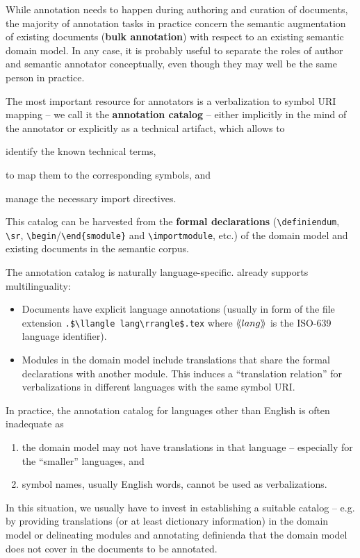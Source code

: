 \documentclass[runningheads]{llncs}
\def\llangle{\langle\kern-.2em\langle}
\def\rrangle{\rangle\kern-.2em\rangle}
\begin{document}
While annotation needs to happen during authoring and curation of documents, the majority
of annotation tasks in practice concern the semantic augmentation of existing documents
(\textbf{bulk annotation}) with respect to an existing semantic domain model. In any case,
it is probably useful to separate the roles of author and semantic annotator conceptually,
even though they may well be the same person in practice.

The most important resource for annotators is a verbalization to symbol URI mapping -- we
call it the \textbf{annotation catalog} -- either implicitly in the mind of the annotator
or explicitly as a technical artifact, which allows to
\begin{inparaenum}[\em i\rm)]
\item identify the known technical terms,
\item to map them to the corresponding symbols, and 
\item manage the necessary import directives.
\end{inparaenum}
This catalog can be harvested from the \textbf{formal declarations}
(\lstinline|\definiendum|, \lstinline|\sr|, \lstinline[language={}]|\begin|/\lstinline[language={}]|\end{smodule}| and
\lstinline|\importmodule|, etc.) of the domain model and existing documents in the
semantic corpus.

The annotation catalog is naturally language-specific.
\sTeX already supports multilinguality:
\begin{itemize}
\item Documents have explicit language annotations (usually in form of the file extension
  \lstinline[mathescape]|.$\llangle lang\rrangle$.tex| where $\llangle lang\rrangle$ is the
  ISO-639 language identifier).
\item Modules in the domain model include translations that share the formal
    declarations with another module.
        This induces a ``translation relation'' for verbalizations
        in different languages with the same symbol URI.
\end{itemize}
In practice, the annotation catalog for languages other than English is often inadequate as
\begin{enumerate}[\em i\rm)]
    \item the domain model may not have translations in that language -- especially for the ``smaller'' languages, and
    \item symbol names, usually English words, cannot be used as verbalizations.
\end{enumerate}
In this situation, we usually have to invest in
establishing a suitable catalog -- e.g. by providing translations (or at least dictionary
information) in the domain model or
delineating modules and annotating definienda that the
domain model does not cover in the documents to be annotated.
\end{document}
